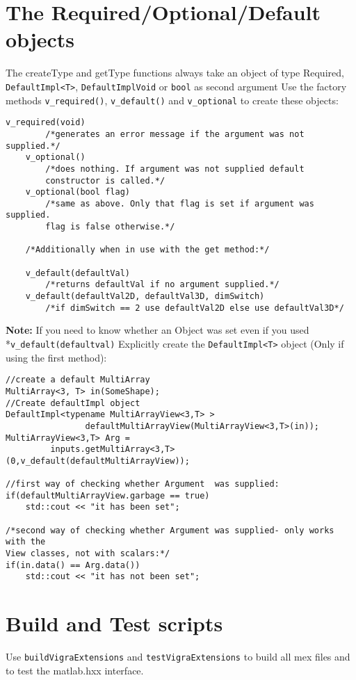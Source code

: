 \documentclass[a4paper,10pt]{article}
\begin{document}
\section{The Required/Optional/Default objects}
The createType and getType functions always take an object of type Required, 
\verb+DefaultImpl<T>+,  \verb+DefaultImplVoid+ or \verb+bool+ as second argument 
Use the factory methods \verb+v_required()+, \verb+v_default()+ and 
\verb+v_optional+ to create these objects:

\begin{lstlisting}[caption={Behavior of the get/set functions with the factory objects}]
	v_required(void)
		/*generates an error message if the argument was not supplied.*/
	v_optional()
		/*does nothing. If argument was not supplied default 
		constructor is called.*/
	v_optional(bool flag)
		/*same as above. Only that flag is set if argument was supplied. 
		flag is false otherwise.*/
	
	/*Additionally when in use with the get method:*/
	
	v_default(defaultVal)
		/*returns defaultVal if no argument supplied.*/
	v_default(defaultVal2D, defaultVal3D, dimSwitch)
		/*if dimSwitch == 2 use defaultVal2D else use defaultVal3D*/
\end{lstlisting}

\textbf{Note:} 	If you need to know whether an Object was set even if you used \\*\verb+v_default(defaultval)+
	Explicitly create the \verb+DefaultImpl<T>+ object (Only if using the first method):

\begin{lstlisting}[caption={Finding out whether a default object was set}]	
//create a default MultiArray
MultiArray<3, T> in(SomeShape);
//Create defaultImpl object
DefaultImpl<typename MultiArrayView<3,T> > 
				defaultMultiArrayView(MultiArrayView<3,T>(in));
MultiArrayView<3,T> Arg = 
		 inputs.getMultiArray<3,T>(0,v_default(defaultMultiArrayView));

//first way of checking whether Argument  was supplied:
if(defaultMultiArrayView.garbage == true) 
	std::cout << "it has been set";

/*second way of checking whether Argument was supplied- only works with the 
View classes, not with scalars:*/
if(in.data() == Arg.data()) 
	std::cout << "it has not been set";
\end{lstlisting}
\section{Build and Test scripts}
Use \verb+buildVigraExtensions+ and \verb+testVigraExtensions+ to build all mex files and to test the 
matlab.hxx interface.
\end{document}
